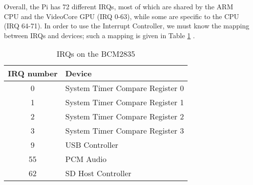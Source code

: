         Overall, the Pi has 72 different IRQs, most of which are shared by the
        ARM CPU and the VideoCore GPU (IRQ 0-63), while some are specific to the
        CPU (IRQ 64-71). In order to use the Interrupt Controller, we must know
        the mapping between IRQs and devices; such a mapping is given in Table
        \ref{tab:IRQ_nos} \cite{ARM_IRQs}.
        \begin{table}[h]
            \centering
            \begin{tabular}{|c|l|}
                \hline
                \textbf{IRQ number} & \textbf{Device} \\ \hline
                0 & System Timer Compare Register 0 \\ \hline
                1 & System Timer Compare Register 1 \\ \hline
                2 & System Timer Compare Register 2 \\ \hline
                3 & System Timer Compare Register 3 \\ \hline
                9 & USB Controller \\ \hline
                55 & PCM Audio \\ \hline
                62 & SD Host Controller \\ \hline
            \end{tabular}
            \caption{IRQs on the BCM2835}
            \label{tab:IRQ_nos}
        \end{table}

